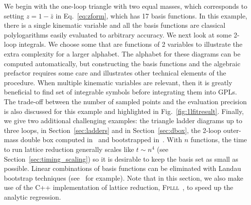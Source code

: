 \documentclass[a4paper,11pt]{article}
\newcommand{\zb}{\bar{z}}
\begin{document}
We begin with the one-loop triangle with two equal masses, which corresponds to setting $z=1-\zb$ in Eq.~\eqref{eq:zform}, which has 17 basis functions.  In this example, there is a single kinematic variable and all the basis functions are classical polylogarithms easily evaluated to arbitrary accuracy.
We next look at some 2-loop integrals. We choose some that are functions of 2 variables to illustrate the extra complexity for a larger alphabet. The alphabet for these diagrams can be computed automatically, but constructing the basis functions and the algebraic prefactor requires some care and illustrates other technical elements of the procedure.
When multiple kinematic variables are relevant, then it is greatly beneficial to find set of integrable symbols before integrating them into GPLs. 
The trade-off between the number of sampled points and the evaluation precision is also discussed for this example and highlighted in Fig.~\ref{fig:1lfitresult}. 
Finally, we give two additional challenging examples: the triangle ladder diagrams up to three loops, in Section~\ref{sec:ladders} and in Section~\ref{sec:dbox}, the 2-loop outer-mass double box computed in~\cite{Caron-Huot:2014lda} and bootstrapped in~\cite{Hannesdottir:2024hke}.
With $n$ functions, the time to run lattice reduction generally scales like $t\sim n^4$ (see Section~\ref{sec:timing_scaling}) so it is desirable to keep the basis set as small as possible.
Linear combinations of basis functions can be eliminated with Landau bootstrap techniques (see~\cite{Hannesdottir:2024hke} for example). Note that in this section, we also make use of the C++ implementation of lattice reduction, \textsc{Fplll}~\cite{fplll}, to speed up the analytic regression. 


 
\end{document}
